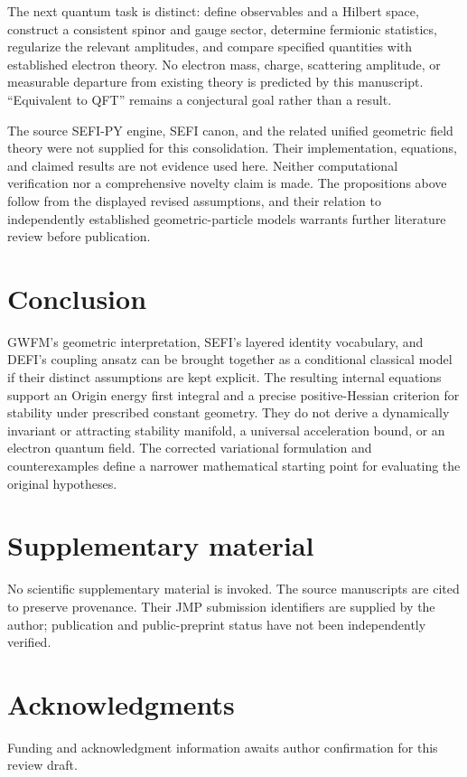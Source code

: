 \documentclass[aip,jmp,reprint,onecolumn,amsmath,amssymb]{revtex4-2}
\begin{document}
The next quantum task is distinct: define observables and a Hilbert space, construct a consistent spinor and gauge sector, determine fermionic statistics, regularize the relevant amplitudes, and compare specified quantities with established electron theory. No electron mass, charge, scattering amplitude, or measurable departure from existing theory is predicted by this manuscript. ``Equivalent to QFT'' remains a conjectural goal rather than a result.

The source SEFI-PY engine, SEFI canon, and the related unified geometric field theory were not supplied for this consolidation. Their implementation, equations, and claimed results are not evidence used here. Neither computational verification nor a comprehensive novelty claim is made. The propositions above follow from the displayed revised assumptions, and their relation to independently established geometric-particle models warrants further literature review before publication.

\section{Conclusion}
GWFM's geometric interpretation, SEFI's layered identity vocabulary, and DEFI's coupling ansatz can be brought together as a conditional classical model if their distinct assumptions are kept explicit. The resulting internal equations support an Origin energy first integral and a precise positive-Hessian criterion for stability under prescribed constant geometry. They do not derive a dynamically invariant or attracting stability manifold, a universal acceleration bound, or an electron quantum field. The corrected variational formulation and counterexamples define a narrower mathematical starting point for evaluating the original hypotheses.

\section*{Supplementary material}
No scientific supplementary material is invoked. The source manuscripts are cited to preserve provenance. Their JMP submission identifiers are supplied by the author; publication and public-preprint status have not been independently verified.
\section*{Acknowledgments}
Funding and acknowledgment information awaits author confirmation for this review draft.
\end{document}
